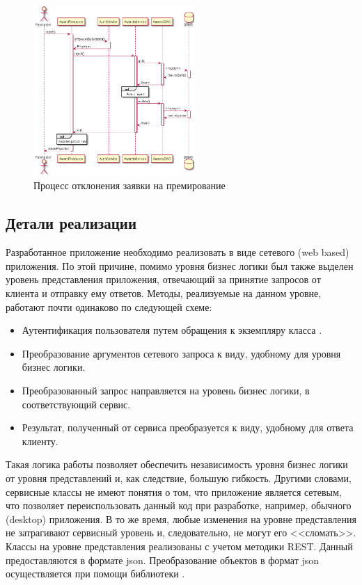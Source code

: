 \begin{figure}[H]
    \centering
    \includegraphics[width=0.55\textwidth]{resources/02_implementation/04_decline_award.png}
    \caption{Процесс отклонения заявки на премирование}
    \label{fig:02-decline-award}
\end{figure}

\subsection{Детали реализации}

Разработанное приложение необходимо реализовать в виде сетевого (web based) приложения. По этой причине, помимо уровня бизнес логики был 
также выделен уровень представления приложения, отвечающий за принятие запросов от клиента и отправку ему ответов. Методы, реализуемые на 
данном уровне, работают почти одинаково по следующей схеме:
\begin{itemize}
    \item Аутентификация пользователя путем обращения к экземпляру класса .
    \item Преобразование аргументов сетевого запроса к виду, удобному для уровня бизнес логики.
    \item Преобразованный запрос направляется на уровень бизнес логики, в соответствующий сервис.
    \item Результат, полученный от сервиса преобразуется к виду, удобному для ответа клиенту. 
\end{itemize}
Такая логика работы позволяет обеспечить независимость уровня бизнес логики от уровня представлений и, как следствие, большую гибкость. 
Другими словами, сервисные классы не имеют понятия о том, что приложение является сетевым, что позволяет переиспользовать данный код
при разработке, например, обычного (desktop) приложения. В то же время, любые изменения на уровне представления не затрагивают сервисный
уровень и, следовательно, не могут его <<сломать>>. Классы на уровне представления реализованы с учетом методики REST. Данный 
предоставляются в формате json. Преобразование объектов в формат json осуществляется при помощи библиотеки . 

